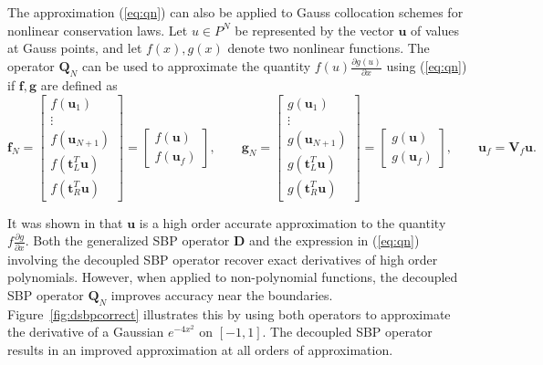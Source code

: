 \documentclass[review,onefignum,onetabnum,final]{siamart171218}
\newcommand{\pd}[2]{\frac{\partial#1}{\partial#2}}
\newcommand{\LRp}[1]{\left( #1 \right)}
\begin{document}
The approximation (\ref{eq:qn}) can also be applied to Gauss collocation schemes for nonlinear conservation laws. Let $u \in P^N$ be represented by the vector $\bm{u}$ of values at Gauss points, and let $f(x), g(x)$ denote two nonlinear functions.   The operator $\bm{Q}_N$ can be used to approximate the quantity $f(u)\pd{g(u)}{x}$ using (\ref{eq:qn}) if $\bm{f}, \bm{g}$ are defined as
\[
\bm{f}_N = \begin{bmatrix}
f\LRp{\bm{u}_1}\\
\vdots\\
f\LRp{\bm{u}_{N+1}}\\
f\LRp{\bm{t}_L^T\bm{u}}\\
f\LRp{\bm{t}_R^T\bm{u}}
\end{bmatrix} = \begin{bmatrix}
f(\bm{u}) \\
f(\bm{u}_f)
\end{bmatrix}, \qquad
\bm{g}_N = \begin{bmatrix}
g\LRp{\bm{u}_1}\\
\vdots\\
g\LRp{\bm{u}_{N+1}}\\
g\LRp{\bm{t}_L^T\bm{u}}\\
g\LRp{\bm{t}_R^T\bm{u}}
\end{bmatrix} = \begin{bmatrix}
g(\bm{u}) \\
g(\bm{u}_f)
\end{bmatrix}, \qquad \bm{u}_f = \bm{V}_f\bm{u}.
\]

It was shown in \cite{chan2017discretely} that $\bm{u}$ is a high order accurate approximation to the quantity $f\pd{g}{x}$.  Both the generalized SBP operator $\bm{D}$ and the expression in (\ref{eq:qn}) involving the decoupled SBP operator recover exact derivatives of high order polynomials.  However, when applied to non-polynomial functions, the decoupled SBP operator $\bm{Q}_N$ improves accuracy near the boundaries.  Figure~\ref{fig:dsbpcorrect} illustrates this by using both operators to approximate the derivative of a Gaussian $e^{-4x^2}$ on $[-1,1]$.  The decoupled SBP operator results in an improved approximation at all orders of approximation.  %
\end{document}
